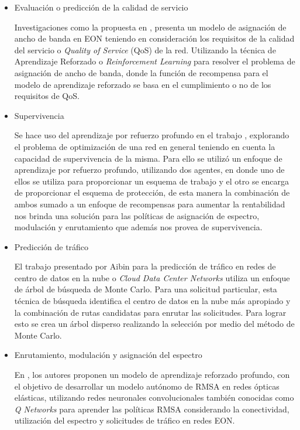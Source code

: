 \begin{itemize}
    \item Evaluación o predicción de la calidad de servicio
    
    Investigaciones como la propuesta en \cite{panayiotou2019data}, presenta un modelo de asignación de ancho de banda en EON teniendo en consideración los requisitos de la calidad del servicio o \textit{Quality of Service} (QoS) de la red. Utilizando la técnica de Aprendizaje Reforzado o \textit{Reinforcement Learning} para resolver el problema de asignación de ancho de banda, donde la función de recompensa para el modelo de aprendizaje reforzado se basa en el cumplimiento o no de los requisitos de QoS.
    
    \item Supervivencia
    
    Se hace uso del aprendizaje por refuerzo profundo en el trabajo \cite{luo2019leveraging}, explorando el problema de optimización de una red en general teniendo en cuenta la capacidad de supervivencia de la misma. Para ello se utilizó un enfoque de aprendizaje por refuerzo profundo, utilizando dos agentes, en donde uno de ellos se utiliza para proporcionar un esquema de trabajo y el otro se encarga de proporcionar el esquema de protección, de esta manera la combinación de ambos sumado a un enfoque de recompensas para aumentar la rentabilidad nos brinda una solución para las políticas de asignación de espectro, modulación y enrutamiento que además nos provea de  supervivencia.
    
    \item Predicción de tráfico
    
    El trabajo presentado por Aibin \cite{aibin2018traffic} para la predicción de tráfico en redes de centro de datos en la nube o \textit{Cloud Data Center Networks} utiliza un enfoque de árbol de búsqueda de Monte Carlo. Para una solicitud particular, esta técnica de búsqueda identifica el centro de datos en la nube más apropiado y la combinación de rutas candidatas para enrutar las solicitudes. Para lograr esto se crea un árbol disperso realizando la selección por medio del método de Monte Carlo.
    
    \item Enrutamiento, modulación y asignación del espectro
    
    En \cite{chen2018deep}, los autores proponen un modelo de aprendizaje reforzado profundo, con el objetivo de desarrollar un modelo autónomo de RMSA en redes ópticas elásticas, utilizando redes neuronales convolucionales también conocidas como \textit{Q Networks} para aprender las políticas RMSA considerando la conectividad, utilización del espectro y solicitudes de tráfico en redes EON.
    
    
\end{itemize}

